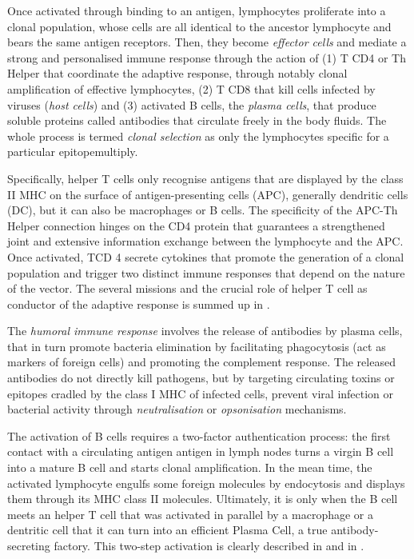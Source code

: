 \begin{enumerate}[label=(\alph*)]
    Once activated through binding to an antigen, lymphocytes proliferate into a clonal population, whose cells are all identical to the ancestor lymphocyte and bears the same antigen receptors. Then,  they become \emph{effector cells} and mediate a strong and personalised immune response through the action of (1) T CD4 or Th Helper that coordinate the adaptive response, through notably clonal amplification of effective lymphocytes, (2) T CD8 that kill cells infected
by viruses (\emph{host cells}) and (3) activated B cells, the \emph{plasma cells}, that produce soluble proteins called antibodies that circulate freely in the body fluids. The whole process is termed \emph{clonal selection} as only the lymphocytes specific for a particular epitopemultiply. 

Specifically, helper T cells only recognise antigens that are displayed by the class II MHC on the surface of antigen-presenting cells (APC), generally dendritic cells (DC), but it can also be macrophages or B cells. The specificity of the APC-Th Helper connection hinges on the CD4 protein that guarantees a strengthened joint and extensive information exchange between the lymphocyte and the APC. Once activated, TCD 4 secrete cytokines that promote the generation of a clonal population  and trigger two distinct immune responses that depend on the nature of the vector. The several missions and the crucial role of helper T cell as conductor of the adaptive response is summed up in \autocite[Figure 18, Chapter 43]{campbell_etal20}.

The \emph{humoral immune response} involves the release of antibodies by plasma cells, that in turn promote bacteria elimination by facilitating phagocytosis (act as markers of foreign cells) and promoting the complement response. The released antibodies do not directly kill pathogens, but by targeting circulating toxins or epitopes cradled by the class I MHC of infected cells, prevent viral infection or bacterial activity through \emph{\gls{neutralisation}} or \emph{opsonisation} mechanisms. 

The activation of B cells requires a two-factor authentication process: the first contact with a circulating antigen antigen in lymph nodes turns a virgin B cell into a mature B cell and starts clonal amplification. In the mean time, the activated lymphocyte engulfs some foreign molecules by endocytosis and displays them through its MHC class II molecules. Ultimately, it is only when the B cell meets an helper T cell that was activated in parallel by a macrophage or a dentritic cell that it can turn into an efficient Plasma Cell, a true antibody-secreting factory. This two-step activation is clearly described in \autocite[Figure 19, Chapter 43]{campbell_etal20} and in \autocite[Figures 1 and 2, Chapter 21]{dettmer21}. 


\end{enumerate}
